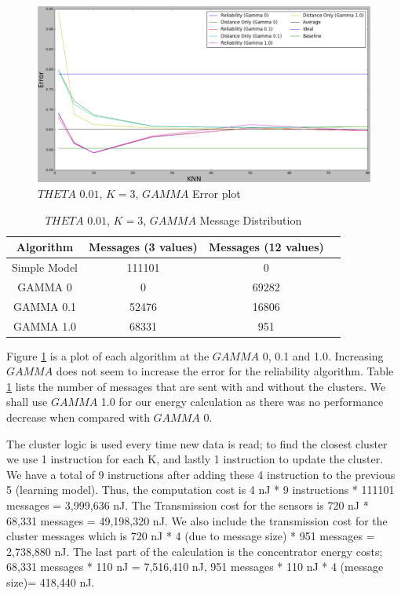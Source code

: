 \documentclass{mproj}
\begin{document}
\begin{figure}[H]
\caption{$THETA$ $0.01$, $K=3$, $GAMMA$ Error plot}
\label{fig:gammak3}
\centerline{\includegraphics[scale=0.5]{k3gamma}}
\end{figure}

\begin{table}[!ht]
 \centering
 \begin{tabular}{|| c | c | c | c ||}
 \hline
 Algorithm & Messages (3 values) & Messages (12 values)\\
 \hline\hline
 Simple Model & 111101 & 0 \\ 
 \hline
 GAMMA 0 & 0 & 69282 \\
 \hline
 GAMMA 0.1 & 52476 & 16806 \\
 \hline
 GAMMA 1.0 & 68331 & 951 \\
 \hline
\end{tabular}
\caption{$THETA$ $0.01$, $K=3$, $GAMMA$ Message Distribution}
 \label{table:thetaGammaMessages} 
\end{table}

Figure \ref{fig:gammak3} is a plot of each algorithm at the $GAMMA$ 0, 0.1 and 1.0. Increasing $GAMMA$ does not seem to increase the error for the reliability algorithm. Table \ref{table:thetaGammaMessages} lists the number of messages that are sent with and without the clusters.  We shall use $GAMMA$ 1.0 for our energy calculation as there was no performance decrease when compared with $GAMMA$ 0.

The cluster logic is used every time new data is read; to find the closest cluster we use 1 instruction for each K, and lastly 1 instruction to update the cluster. We have a total of 9 instructions after adding these 4 instruction to the previous 5 (learning model). Thus, the computation cost is 4 nJ * 9 instructions * 111101 messages = 3,999,636 nJ. The Transmission cost for the sensors is 720 nJ * 68,331 messages = 49,198,320 nJ. We also include the transmission cost for the cluster messages which is 720 nJ * 4 (due to message size) * 951 messages = 2,738,880 nJ. The last part of the calculation is the concentrator energy costs; 68,331 messages * 110 nJ = 7,516,410 nJ, 951 messages * 110 nJ * 4 (message size)= 418,440 nJ.
\end{document}

